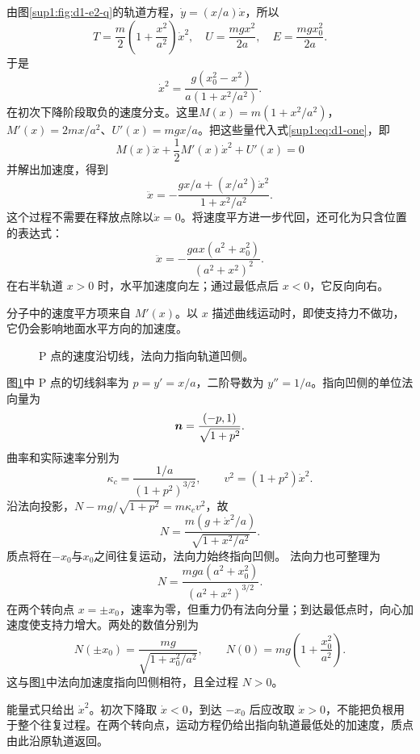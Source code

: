 \begin{solution}
由图\ref{sup1:fig:d1-e2-q}的轨道方程，$\dot y=(x/a)\dot x$，所以
\[
T=\frac m2\left(1+\frac{x^2}{a^2}\right)\dot x^2,
\quad U=\frac{mgx^2}{2a},\quad E=\frac{mgx_0^2}{2a}.
\]
于是
\begin{equation}\label{sup1:eq:d1-parabola}
\boxed{\dot x^2=\frac{g(x_0^2-x^2)}{a(1+x^2/a^2)}}.
\end{equation}
在初次下降阶段取负的速度分支。这里$M(x)=m(1+x^2/a^2)$，$M'(x)=2mx/a^2$、$U'(x)=mgx/a$。把这些量代入式\eqref{sup1:eq:d1-one}，即
\[
M(x)\ddot x+\frac12M'(x)\dot x^2+U'(x)=0
\]
并解出加速度，得到
\[
\boxed{\ddot x=-\frac{gx/a+(x/a^2)\dot x^2}{1+x^2/a^2}}.
\]
这个过程不需要在释放点除以$\dot x=0$。将速度平方进一步代回，还可化为只含位置的表达式：
\[
\ddot x=-\frac{ga x(a^2+x_0^2)}{(a^2+x^2)^2}.
\]
在右半轨道 $x>0$ 时，水平加速度向左；通过最低点后 $x<0$，它反向向右。

分子中的速度平方项来自 $M\prime(x)$。以 $x$ 描述曲线运动时，即使支持力不做功，它仍会影响地面水平方向的加速度。

\begin{figure}[H]\centering
{}
\caption{P 点的速度沿切线，法向力指向轨道凹侧。}\label{sup1:fig:d1-e2-s}
\end{figure}

图\ref{sup1:fig:d1-e2-s}中 P 点的切线斜率为 $p=y'=x/a$，二阶导数为 $y''=1/a$。指向凹侧的单位法向量为
\[
\bm{n}=\frac{(-p,1)}{\sqrt{1+p^2}}.
\]
曲率和实际速率分别为
\[
\kappa_c=\frac{1/a}{(1+p^2)^{3/2}},\qquad
v^2=(1+p^2)\dot x^2.
\]
沿法向投影，$N-mg/\sqrt{1+p^2}=m\kappa_c v^2$，故
\[
\boxed{N=\frac{m(g+\dot x^2/a)}{\sqrt{1+x^2/a^2}}}.
\]
质点将在$-x_0$与$x_0$之间往复运动，法向力始终指向凹侧。
法向力也可整理为
\[
N=\frac{mga(a^2+x_0^2)}{(a^2+x^2)^{3/2}}.
\]
在两个转向点 $x=\pm x_0$，速率为零，但重力仍有法向分量；到达最低点时，向心加速度使支持力增大。两处的数值分别为
\[
N(\pm x_0)=\frac{mg}{\sqrt{1+x_0^2/a^2}},\qquad
N(0)=mg\left(1+\frac{x_0^2}{a^2}\right).
\]
这与图\ref{sup1:fig:d1-e2-s}中法向加速度指向凹侧相符，且全过程 $N>0$。

能量式只给出 $\dot x^2$。初次下降取 $\dot x<0$，到达 $-x_0$ 后应改取 $\dot x>0$，不能把负根用于整个往复过程。在两个转向点，运动方程仍给出指向轨道最低处的加速度，质点由此沿原轨道返回。

\end{solution}



